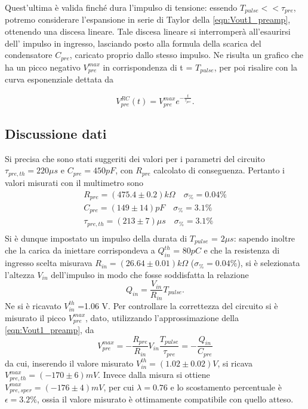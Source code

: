 \documentclass{article}
\begin{document}
Quest'ultima è valida finché dura l'impulso di tensione: essendo $T_{pulse} << \tau_{pre}$, potremo considerare l'espansione in 
serie di Taylor della \ref{eqn:Vout1_preamp}, ottenendo una discesa lineare. Tale discesa lineare si interromperà all'esaurirsi dell'
impulso in ingresso, lasciando posto alla formula della scarica del condensatore $C_{pre}$, caricato proprio dallo stesso impulso.
Ne risulta un grafico che ha un picco negativo $V_{pre}^{max}$ in corrispondenza di t = $T_{pulse}$, per poi risalire con la curva esponenziale
dettata da

\begin{equation}
    \label{eqn:Vout2_preamp}
    V_{pre}^{RC}(t) = V_{pre}^{max}e^{-\frac{t}{\tau_{pre}}}.
\end{equation}

\subsection{Discussione dati}

Si precisa che sono stati suggeriti dei valori per i parametri del circuito $\tau_{pre,th} = 220 \mu s$ e $C_{pre} = 450 pF$, con $R_{pre}$ calcolato di 
conseguenza. Pertanto i valori misurati con il multimetro sono
\begin{align*}
    R_{pre} = (475.4 \pm 0.2)k\Omega \quad \sigma_{\%}=0.04 \% \\    
    C_{pre} = (149 \pm 14) pF \quad \sigma_{\%}=3.1 \%    \\
    \tau_{pre,th} = (213 \pm 7)\mu s \quad \sigma_{\%}=3.1 \%     \\
\end{align*}
Si è dunque impostato un impulso della durata di $T_{pulse}$ = $2 \mu s$: sapendo inoltre che la carica da iniettare 
corrispondeva a $Q_{in}^{th}$ = $80 pC$ e che la resistenza di ingresso scelta misurava $R_{in}=(26.64\pm0.01) k\Omega$ ($\sigma_{\%}=0.04\%$), 
si è selezionata l'altezza $V_{in}$ dell'impulso in modo che fosse soddisfatta la relazione
\begin{equation}
    \label{eqn:Qin}
    Q_{in} = \frac{V_{in}}{R_{in}} T_{pulse}.
\end{equation}
Ne si è ricavato $V_{in}^{th}$ =1.06 V. Per controllare la correttezza del circuito si è misurato il picco $V_{pre}^{max}$,
dato, utilizzando l'approssimazione della \ref{eqn:Vout1_preamp}, da
\begin{equation}
    \label{eqn:Vpre_max}
    V_{pre}^{max} = -\frac{R_{pre}}{R_{in}} V_{in} \frac{T_{pulse}}{\tau_{pre}} = - \frac{Q_{in}}{C_{pre}}
\end{equation}
da cui, inserendo il valore misurato $V_{in}^{th}=(1.02\pm 0.02) V$, si ricava $V_{pre,th}^{max} =  (-170 \pm 6) mV$. Invece dalla 
misura si ottiene $V_{pre,sper}^{max} = (-176 \pm 4) mV$, per cui $\lambda = 0.76$ e lo scostamento percentuale è $\epsilon = 3.2 \%$, 
ossia il valore misurato è ottimamente compatibile con quello atteso.
\end{document}
